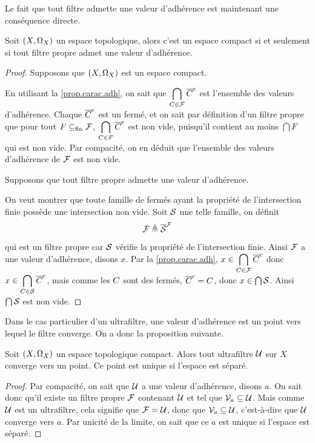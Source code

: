 \noindent
Le fait que tout filtre admette une valeur d'adhérence est maintenant une
conséquence directe.

\begin{proposition}
  Soit $(X,\Omega_{X})$ un espace topologique, alors c'est un espace compact si
  et seulement si tout filtre propre admet une valeur d'adhérence.
\end{proposition}

\begin{proof}
  Supposons que $(X,\Omega_{X})$ est un espace compact.

  \noindent
  En utilisant la \cref{prop.carac.adh}, on sait que
  $\displaystyle\bigcap_{C\in\mathcal{F}}\overline{C}^{\mathrm c}$ est l'ensemble des valeurs
  d'adhérence. Chaque $\overline{C}^{\mathrm c}$ est un fermé, et on sait par définition
  d'un filtre propre que pour tout $F\subseteq_{\mathrm{fin}}\mathcal{F}$,
  $\displaystyle\bigcap_{C\in F}\overline{C}^{\mathrm c}$ est non vide, puisqu'il
  contient au moins $\bigcap F$ qui est non vide. Par compacité, on en déduit
  que l'ensemble des valeurs d'adhérence de $\mathcal{F}$ est non vide.

  Supposons que tout filtre propre admette une valeur d'adhérence.

  \noindent
  On veut montrer que toute famille de fermés ayant la propriété de
  l'intersection finie possède une intersection non vide. Soit $\mathcal S$ une
  telle famille, on définit
  \[\mathcal{F} \triangleq \overline{\mathcal S}^{\mathcal{F}}\]
  qui est un filtre propre car $\mathcal S$ vérifie la propriété de
  l'intersection finie. Ainsi $\mathcal{F}$ a une valeur d'adhérence, disons $x$.
  Par la \cref{prop.carac.adh},
  $\displaystyle x\in\bigcap_{C\in \mathcal{F}}\overline{C}^{\mathrm c}$ donc
  $\displaystyle x\in\bigcap_{C\in \mathcal S}\overline{C}^{\mathrm c}$, mais comme les
  $C$ sont des fermés, $\overline{C}^{\mathrm c} = C$, donc
  $x\in \bigcap \mathcal S$. Ainsi $\bigcap\mathcal S$ est non vide.
\end{proof}

Dans le cas particulier d'un ultrafiltre, une valeur d'adhérence est un point
vers lequel le filtre converge. On a donc la proposition suivante.

\begin{proposition}
  Soit $(X,\Omega_{X})$ un espace topologique compact. Alors tout
  ultrafiltre $\mathcal{U}$ sur $X$ converge vers un point. Ce point est unique
  si l'espace est séparé.
\end{proposition}

\begin{proof}
  Par compacité, on sait que $\mathcal{U}$ a une valeur d'adhérence, disons
  $a$. On sait donc qu'il existe un filtre propre $\mathcal{F}$ contenant
  $\mathcal{U}$ et tel que $\mathcal{V}_{a}\subseteq \mathcal{U}$. Mais comme
  $\mathcal{U}$ est un ultrafiltre, cela signifie que $\mathcal{F} = \mathcal{U}$,
  donc que $\mathcal{V}_{a}\subseteq\mathcal{U}$, c'est-à-dire que $\mathcal{U}$
  converge vers $a$. Par unicité de la limite, on sait que ce $a$ est unique si
  l'espace est séparé.
\end{proof}

